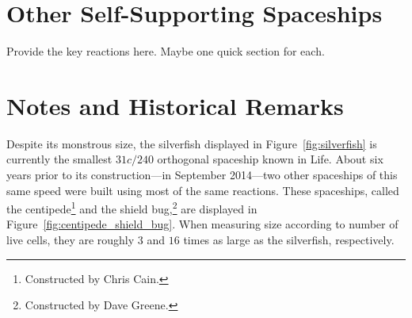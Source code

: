 


\section{Other Self-Supporting Spaceships}\label{sec:other_self_support}

Provide the key reactions here. Maybe one quick section for each.



\section{Notes and Historical Remarks}\label{sec:self_support_history}

Despite its monstrous size, the silverfish displayed in Figure~\ref{fig:silverfish} is currently the smallest $31c/240$ orthogonal spaceship known in Life. About six years prior to its construction---in September 2014---two other spaceships of this same speed were built using most of the same reactions. These spaceships, called the centipede\footnote{Constructed by Chris Cain.} and the shield bug,\footnote{Constructed by Dave Greene.} are displayed in Figure~\ref{fig:centipede_shield_bug}. When measuring size according to number of live cells, they are roughly $3$ and $16$ times as large as the silverfish, respectively.





